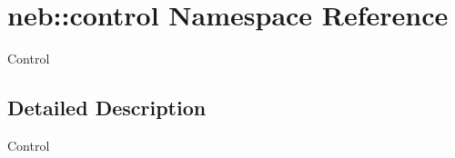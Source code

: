 \hypertarget{namespaceneb_1_1control}{
\section{neb::control Namespace Reference}
\label{namespaceneb_1_1control}
}


Control  


\subsection{Detailed Description}
Control 